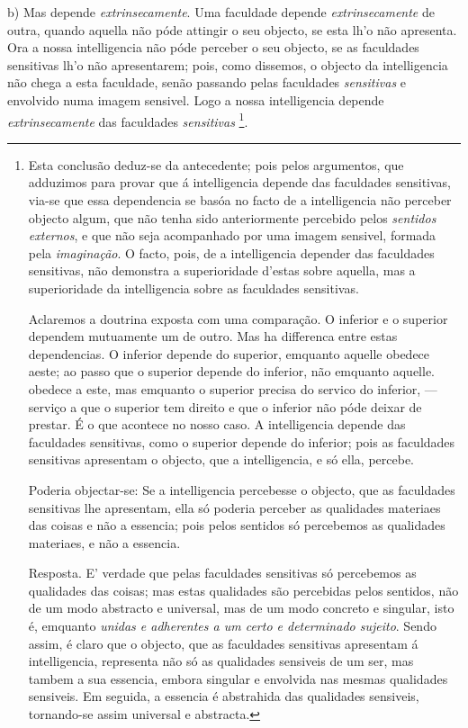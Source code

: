 b) Mas depende \emph{extrinsecamente}. Uma faculdade depende \emph{extrinsecamente} de outra, quando aquella não póde attingir o seu objecto, se esta lh'o não apresenta. Ora a nossa intelligencia não póde perceber o seu objecto, se as faculdades sensitivas lh'o não apresentarem; pois, como dissemos, o objecto da intelligencia não chega a esta faculdade, senão passando pelas faculdades \emph{sensitivas} e envolvido numa imagem sensivel. Logo a nossa intelligencia depende \emph{extrinsecamente} das faculdades \emph{sensitivas} \footnote{Esta conclusão deduz-se da antecedente; pois pelos argumentos, que adduzimos para provar que á intelligencia depende das faculdades sensitivas, via-se que essa dependencia se basóa no facto de a intelligencia não perceber objecto algum, que não tenha sido anteriormente percebido pelos \emph{sentidos externos}, e que não seja acompanhado por uma imagem sensivel, formada pela \emph{imaginação}. O facto, pois, de a intelligencia depender das faculdades sensitivas, não demonstra a superioridade d'estas sobre aquella, mas a superioridade da intelligencia sobre as faculdades sensitivas.\par Aclaremos a doutrina exposta com uma comparação. O inferior e o superior dependem mutuamente um de outro. Mas ha differenca entre estas dependencias. O inferior depende do superior, emquanto aquelle obedece aeste; ao passo que o superior depende do inferior, não emquanto aquelle. obedece a este, mas emquanto o superior precisa do servico do inferior, --- serviço a que o superior tem direito e que o inferior não póde deixar de prestar. É o que acontece no nosso caso. A intelligencia depende das faculdades sensitivas, como o superior depende do inferior; pois as faculdades sensitivas apresentam o objecto, que a intelligencia, e só ella, percebe.\par Poderia objectar-se: Se a intelligencia percebesse o objecto, que as faculdades sensitivas lhe apresentam, ella só poderia perceber as qualidades materiaes das coisas e não a essencia; pois pelos sentidos só percebemos as qualidades materiaes, e não a essencia.\par Resposta. E' verdade que pelas faculdades sensitivas só percebemos as qualidades das coisas; mas estas qualidades são percebidas pelos sentidos, não de um modo abstracto e universal, mas de um modo concreto e singular, isto é, emquanto \emph{unidas e adherentes a um certo e determinado sujeito}. Sendo assim, é claro que o objecto, que as faculdades sensitivas apresentam á intelligencia, representa não só as qualidades sensiveis de um ser, mas tambem a sua essencia, embora singular e envolvida nas mesmas qualidades sensiveis. Em seguida, a essencia é abstrahida das qualidades sensiveis, tornando-se assim universal e abstracta.}.

